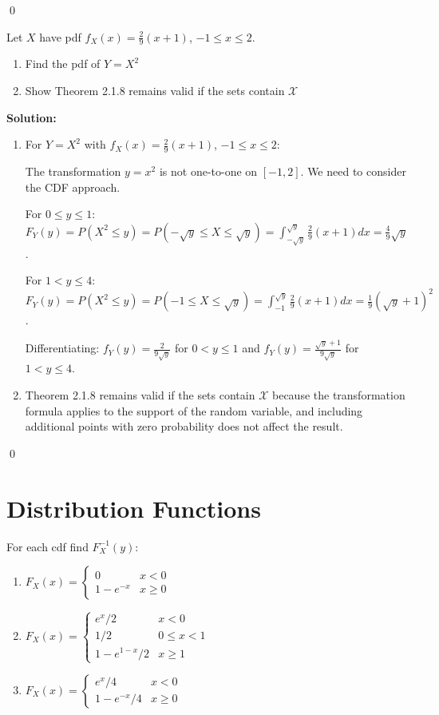 \qed
\begin{problembox}
Let $X$ have pdf $f_X(x) = \frac{2}{9}(x+1)$, $-1 \leq x \leq 2$.
\begin{enumerate}[label=(\alph*)]
    \item Find the pdf of $Y = X^2$
    \item Show Theorem 2.1.8 remains valid if the sets contain $\mathcal{X}$
\end{enumerate}
\end{problembox}

\noindent\textbf{Solution:}
\begin{enumerate}[label=(\alph*)]
    \item For $Y = X^2$ with $f_X(x) = \frac{2}{9}(x+1)$, $-1 \leq x \leq 2$:
    
    The transformation $y = x^2$ is not one-to-one on $[-1,2]$. We need to consider the CDF approach.
    
    For $0 \leq y \leq 1$: $F_Y(y) = P(X^2 \leq y) = P(-\sqrt{y} \leq X \leq \sqrt{y}) = \int_{-\sqrt{y}}^{\sqrt{y}} \frac{2}{9}(x+1)dx = \frac{4}{9}\sqrt{y}$.
    
    For $1 < y \leq 4$: $F_Y(y) = P(X^2 \leq y) = P(-1 \leq X \leq \sqrt{y}) = \int_{-1}^{\sqrt{y}} \frac{2}{9}(x+1)dx = \frac{1}{9}(\sqrt{y}+1)^2$.
    
    Differentiating: $f_Y(y) = \frac{2}{9\sqrt{y}}$ for $0 < y \leq 1$ and $f_Y(y) = \frac{\sqrt{y}+1}{9\sqrt{y}}$ for $1 < y \leq 4$.
    
    \item Theorem 2.1.8 remains valid if the sets contain $\mathcal{X}$ because the transformation formula applies to the support of the random variable, and including additional points with zero probability does not affect the result.
\end{enumerate}


\qed
\section{Distribution Functions}

\begin{problembox}
For each cdf find $F_X^{-1}(y)$:
\begin{enumerate}[label=(\alph*)]
    \item $F_X(x) = \begin{cases} 0 & x<0 \\ 1-e^{-x} & x\geq 0 \end{cases}$
    \item $F_X(x) = \begin{cases} e^x/2 & x<0 \\ 1/2 & 0\leq x<1 \\ 1-e^{1-x}/2 & x\geq 1 \end{cases}$
    \item $F_X(x) = \begin{cases} e^x/4 & x<0 \\ 1-e^{-x}/4 & x\geq 0 \end{cases}$
\end{enumerate}
\end{problembox}

